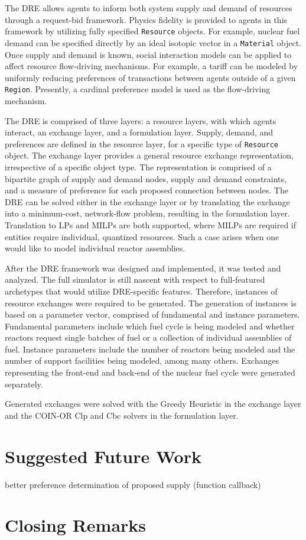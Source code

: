 The DRE allows agents to inform both system supply and demand of resources
through a request-bid framework. Physics fidelity is provided to agents in this
framework by utilizing fully specified \texttt{Resource} objects. For example,
nuclear fuel demand can be specified directly by an ideal isotopic vector in a
\texttt{Material} object. Once supply and demand is known, social interaction
models can be applied to affect resource flow-driving mechanisms. For example, a
tariff can be modeled by uniformly reducing preferences of transactions between
agents outside of a given \texttt{Region}. Presently, a cardinal preference
model is used as the flow-driving mechanism.

The DRE is comprised of three layers: a resource layers, with which agents
interact, an exchange layer, and a formulation layer. Supply, demand, and
preferences are defined in the resource layer, for a specific type of
\texttt{Resource} object. The exchange layer provides a general resource
exchange representation, irrespective of a specific object type. The
representation is comprised of a bipartite graph of supply and demand nodes,
supply and demand constraints, and a measure of preference for each proposed
connection between nodes. The DRE can be solved either in the exchange layer or
by translating the exchange into a minimum-cost, network-flow problem, resulting
in the formulation layer. Translation to LPs and MILPs are both supported, where
MILPs are required if entities require individual, quantized resources. Such a
case arises when one would like to model individual reactor assemblies.

After the DRE framework was designed and implemented, it was tested and
analyzed. The full \Cyclus simulator is still nascent with respect to
full-featured archetypes that would utilize DRE-specific features. Therefore,
instances of resource exchanges were required to be generated. The generation of
instances is based on a parameter vector, comprised of fundamental and instance
parameters. Fundamental parameters include which fuel cycle is being modeled and
whether reactors request single batches of fuel or a collection of individual
assemblies of fuel. Instance parameters include the number of reactors being
modeled and the number of support facilities being modeled, among many
others. Exchanges representing the front-end and back-end of the nuclear fuel
cycle were generated separately.

Generated exchanges were solved with the Greedy Heuristic in the exchange layer
and the COIN-OR Clp and Cbc solvers in the formulation layer. 


\section{Suggested Future Work}

better preference determination of proposed supply (function callback)

\section{Closing Remarks}

